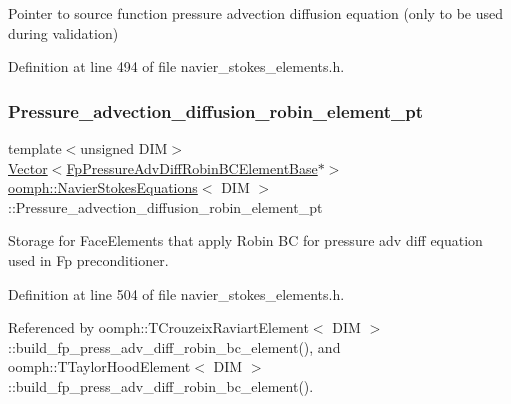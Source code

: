 Pointer to source function pressure advection diffusion equation (only to be used during validation) 



Definition at line 494 of file navier\+\_\+stokes\+\_\+elements.\+h.

\mbox{\label{classoomph_1_1NavierStokesEquations_af794c99b2e7b92201d7b811dda400052}} 
\subsubsection{\texorpdfstring{Pressure\+\_\+advection\+\_\+diffusion\+\_\+robin\+\_\+element\+\_\+pt}{Pressure\_advection\_diffusion\_robin\_element\_pt}}
{\footnotesize\ttfamily template$<$unsigned D\+IM$>$ \\
\hyperlink{classoomph_1_1Vector}{Vector}$<$\hyperlink{classoomph_1_1FpPressureAdvDiffRobinBCElementBase}{Fp\+Pressure\+Adv\+Diff\+Robin\+B\+C\+Element\+Base}$\ast$$>$ \hyperlink{classoomph_1_1NavierStokesEquations}{oomph\+::\+Navier\+Stokes\+Equations}$<$ D\+IM $>$\+::Pressure\+\_\+advection\+\_\+diffusion\+\_\+robin\+\_\+element\+\_\+pt\hspace{0.3cm}{\ttfamily [protected]}}



Storage for Face\+Elements that apply Robin BC for pressure adv diff equation used in Fp preconditioner. 



Definition at line 504 of file navier\+\_\+stokes\+\_\+elements.\+h.



Referenced by oomph\+::\+T\+Crouzeix\+Raviart\+Element$<$ D\+I\+M $>$\+::build\+\_\+fp\+\_\+press\+\_\+adv\+\_\+diff\+\_\+robin\+\_\+bc\+\_\+element(), and oomph\+::\+T\+Taylor\+Hood\+Element$<$ D\+I\+M $>$\+::build\+\_\+fp\+\_\+press\+\_\+adv\+\_\+diff\+\_\+robin\+\_\+bc\+\_\+element().

\mbox{\label{classoomph_1_1NavierStokesEquations_a2491a4baf9df02251bac1ad549a72389}} 
